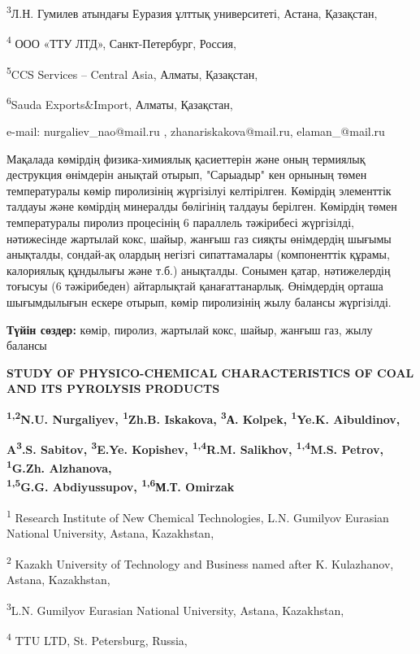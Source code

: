 \textsuperscript{3}Л.Н. Гумилев атындағы Еуразия ұлттық университеті,
Астана, Қазақстан,

\textsuperscript{4} ООО «ТТУ ЛТД», Санкт-Петербург, Россия,

\textsuperscript{5}CCS Services -- Central Asia, Алматы, Қазақстан,

\textsuperscript{6}Sauda Exports\&Import, Алматы, Қазақстан,

e-mail: nurgaliev\_nao@mail.ru , zhanariskakova@mail.ru,
elaman\_@mail.ru

Мақалада көмірдің физика-химиялық қасиеттерін және оның термиялық
деструкция өнімдерін анықтай отырып, "Сарыадыр" кен орнының төмен
температуралы көмір пиролизінің жүргізілуі келтірілген. Көмірдің
элементтік талдауы және көмірдің минералды бөлігінің талдауы берілген.
Көмірдің төмен температуралы пиролиз процесінің 6 параллель тәжірибесі
жүргізілді, нәтижесінде жартылай кокс, шайыр, жанғыш газ сияқты
өнімдердің шығымы анықталды, сондай-ақ олардың негізгі сипаттамалары
(компоненттік құрамы, калориялық құндылығы және т.б.) анықталды. Сонымен
қатар, нәтижелердің тоғысуы (6 тәжірибеден) айтарлықтай қанағаттанарлық.
Өнімдердің орташа шығымдылығын ескере отырып, көмір пиролизінің жылу
балансы жүргізілді.

{\bfseries Түйін сөздер:} көмір, пиролиз, жартылай кокс, шайыр, жанғыш газ,
жылу балансы

{\bfseries STUDY OF PHYSICO-CHEMICAL CHARACTERISTICS OF COAL AND ITS
PYROLYSIS PRODUCTS}

{\bfseries \textsuperscript{1,2}N.U. Nurgaliyev, \textsuperscript{1}Zh.B.
Iskakova, \textsuperscript{3}А. Kolpek, \textsuperscript{1}Ye.K.
Aibuldinov,}

{\bfseries A\textsuperscript{3}.S. Sabitov, \textsuperscript{3}E.Ye.
Kopishev, \textsuperscript{1,4}R.M. Salikhov, \textsuperscript{1,4}M.S.
Petrov, \textsuperscript{1}G.Zh. Alzhanova,\\
\textsuperscript{1,5}G.G. Abdiyussupov, \textsuperscript{1,6}М.Т.
Omirzak}

\textsuperscript{1} Research Institute of New Chemical Technologies,
L.N. Gumilyov Eurasian National University, Astana, Kazakhstan,

\textsuperscript{2} Kazakh University of Technology and Business named
after K. Kulazhanov, Astana, Kazakhstan,

\textsuperscript{3}L.N. Gumilyov Eurasian National University, Astana,
Kazakhstan,

\textsuperscript{4} TTU LTD, St. Petersburg, Russia,

